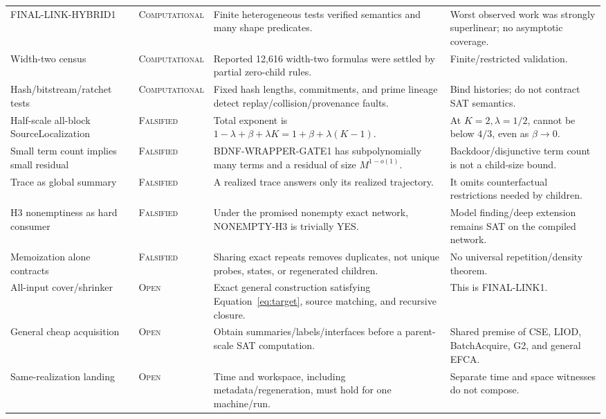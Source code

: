 \documentclass[11pt]{article}
\newcommand{\Comp}{\textsc{Computational}}
\newcommand{\False}{\textsc{Falsified}}
\newcommand{\Open}{\textsc{Open}}
\begin{document}
\begin{longtable}{p{}p{}p{}p{}}
\rowcolor{compgold}
FINAL-LINK-HYBRID1 & \Comp & Finite heterogeneous tests verified semantics and many shape predicates. & Worst observed work was strongly superlinear; no asymptotic coverage.\\
\rowcolor{compgold}
Width-two census & \Comp & Reported 12,616 width-two formulas were settled by partial zero-child rules. & Finite/restricted validation.\\
\rowcolor{compgold}
Hash/bitstream/\allowbreak ratchet tests & \Comp & Fixed hash lengths, commitments, and prime lineage detect replay/collision/provenance faults. & Bind histories; do not contract SAT semantics.\\

\rowcolor{falsepink}
Half-scale all-block SourceLocalization & \False & Total exponent is $1-\lambda+\beta+\lambda K=1+\beta+\lambda(K-1)$. & At $K=2,\lambda=1/2$, cannot be below $4/3$, even as $\beta\to0$.\\
\rowcolor{falsepink}
Small term count implies small residual & \False & BDNF-WRAPPER-GATE1 has subpolynomially many terms and a residual of size $M^{1-o(1)}$. & Backdoor/disjunctive term count is not a child-size bound.\\
\rowcolor{falsepink}
Trace as global summary & \False & A realized trace answers only its realized trajectory. & It omits counterfactual restrictions needed by children.\\
\rowcolor{falsepink}
H3 nonemptiness as hard consumer & \False & Under the promised nonempty exact network, NONEMPTY-H3 is trivially YES. & Model finding/deep extension remains SAT on the compiled network.\\
\rowcolor{falsepink}
Memoization alone contracts & \False & Sharing exact repeats removes duplicates, not unique probes, states, or regenerated children. & No universal repetition/density theorem.\\

\rowcolor{opengray}
All-input cover/shrinker & \Open & Exact general construction satisfying Equation~\ref{eq:target}, source matching, and recursive closure. & This is FINAL-LINK1.\\
\rowcolor{opengray}
General cheap acquisition & \Open & Obtain summaries/labels/interfaces before a parent-scale SAT computation. & Shared premise of CSE, LIOD, BatchAcquire, G2, and general EFCA.\\
\rowcolor{opengray}
Same-realization landing & \Open & Time and workspace, including metadata/regeneration, must hold for one machine/run. & Separate time and space witnesses do not compose.\\
\bottomrule
\end{longtable}
\normalsize
\end{document}
